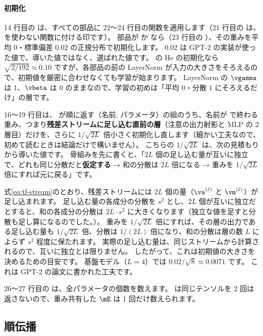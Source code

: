 \paragraph{初期化} 14 行目の  は、すべての部品に 22〜24 行目の関数を適用します（21 行目の  は、 を使わない関数に付ける印です）。
部品が  か  なら（23 行目の ）、その重みを平均 0・標準偏差 0.02 の正規分布で初期化します。
0.02 は GPT-2 の実装が使った値で、導いた値ではなく、選ばれた値です。
の He の初期化なら $\sqrt{2/192}\approx0.10$ ですが、各部品の前の LayerNorm が入力の大きさをそろえるので、初期値を厳密に合わせなくても学習が始まります。
LayerNorm の $\vgamma$ は 1、$\vbeta$ は 0 のままなので、学習の初めは「平均 0・分散 1 にそろえるだけ」の層です。

16〜19 行目は、 が順に返す（名前, パラメータ）の組のうち、名前が  で終わる重み、つまり\textbf{残差ストリームに足し込む直前の層}（注意の出力射影と MLP の 2 層目）だけを、さらに $1/\sqrt{2L}$ 倍小さく初期化し直します（細かい工夫なので、初めて読むときは結論だけで構いません）。
こちらの $1/\sqrt{2L}$ は、次の見積もりから導いた値です。
骨組みを先に書くと、「$2L$ 個の足し込む量が互いに独立で、どれも同じ分散だと\textbf{仮定する} → 和の分散は $2L$ 倍になる → 重みを $1/\sqrt{2L}$ 倍にすれば元に戻る」です。

式\eqref{eq:tf-stream}のとおり、残差ストリームには $2L$ 個の量（$\va^{(\ell)}$ と $\vm^{(\ell)}$）が足し込まれます。
足し込む量の各成分の分散を $s^2$ とし、$2L$ 個が互いに独立だとすると、和の各成分の分散は $2L\cdot s^2$ に大きくなります（独立な値を足すと分散も足し算になるのでした。）。
重みを $1/\sqrt{2L}$ 倍にすれば、その層の出力である足し込む量も $1/\sqrt{2L}$ 倍、分散は $1/(2L)$ 倍になり、和の分散は層の数 $L$ によらず $s^2$ 程度に保たれます。
実際の足し込む量は、同じストリームから計算されるので、互いに独立とは限りません。
したがって、これは初期値の大きさを決めるための目安です。
基盤モデル（$L=4$）では $0.02/\sqrt{8}\approx 0.0071$ です。
これは GPT-2 の論文に書かれた工夫です\cite{radford2019language}。

26〜27 行目の  は、全パラメータの個数を数えます。
 は同じテンソルを 2 回は返さないので、重み共有した $\mE$ は 1 回だけ数えられます。

\subsection*{順伝播}

